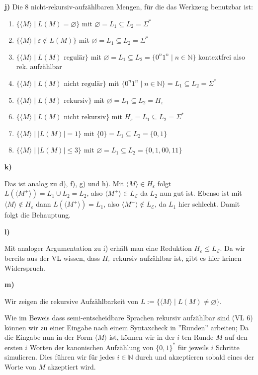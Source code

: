\documentclass[a4paper,graphics,11pt]{article}
\newcommand{\eps}[0]{\varepsilon}
\newcommand{\godel}[1]{\langle #1 \rangle}
\begin{document}
\newpage

\textbf{j)}
Die 8 nicht-rekursiv-aufzählbaren Mengen, für die das Werkzeug benutzbar ist:
\begin{enumerate}
    \item $\{\godel{M} \mid L(M) = \varnothing\}$ mit $\varnothing = L_1 \subseteq L_2 = \Sigma^*$
    \item $\{\godel{M} \mid \eps \notin L(M)\}$ mit $\varnothing = L_1 \subseteq L_2 = \Sigma^*$
    \item $\{\godel{M} \mid L(M) \text{ regulär}\}$ mit
        $\varnothing = L_1 \subseteq L_2 = \{0^n1^n \mid n \in \mathbb{N}\}$ kontextfrei also
        rek. aufzählbar
    \item $\{\godel{M} \mid L(M) \text{ nicht regulär}\}$ mit $\{0^n1^n \mid n \in \mathbb{N}\} = L_1 \subseteq L_2 = \Sigma^*$
    \item $\{\godel{M} \mid L(M) \text{ rekursiv}\}$ mit $\varnothing = L_1 \subseteq L_2 = H_\eps$
    \item $\{\godel{M} \mid L(M) \text{ nicht rekursiv}\}$ mit $H_\eps = L_1 \subseteq L_2 = \Sigma^*$
    \item $\{\godel{M} \mid |L(M)| = 1\}$ mit $\{0\} = L_1 \subseteq L_2 = \{0,1\}$
    \item $\{\godel{M} \mid |L(M)| \leq 3\}$ mit $\varnothing = L_1 \subseteq L_2 = \{0,1,00,11\}$
\end{enumerate}

\strut

\textbf{k)}

Das ist analog zu d), f), g) und h). Mit $\godel{M} \in H_\eps$ folgt $L(\godel{M^+}) = L_1 \cup L_2 = L_2$,
also $\godel{M^+} \in L_\mathcal{E}$ da $L_2$ nun gut ist. Ebenso ist mit $\godel{M} \notin H_\eps$ dann
$L(\godel{M^+}) = L_1$, also $\godel{M^+} \notin L_\mathcal{E}$, da $L_1$ hier schlecht.
Damit folgt die Behauptung.

\strut

\textbf{l)}

Mit analoger Argumentation zu i) erhält man eine Reduktion $H_\eps \leq L_\mathcal{E}$. Da wir bereits
aus der VL wissen, dass $H_\eps$ rekursiv aufzählbar ist, gibt es hier keinen Widerspruch.

\strut

\textbf{m)}

Wir zeigen die rekursive Aufzählbarkeit von $L := \{\godel{M} \mid L(M) \neq \varnothing\}$.

Wie im Beweis dass semi-entscheidbare Sprachen rekursiv aufzählbar sind (VL 6) können wir
zu einer Eingabe nach einem Syntaxcheck in ''Runden'' arbeiten; Da die Eingabe nun in der Form $\godel{M}$ ist,
können wir in der $i$-ten Runde $M$ auf den ersten $i$ Worten der kanonischen Aufzählung von $\{0,1\}^*$
für jeweils $i$ Schritte simulieren. Dies führen wir für jedes $i \in \mathbb{N}$ durch und akzeptieren
sobald eines der Worte von $M$ akzeptiert wird.
\end{document}
